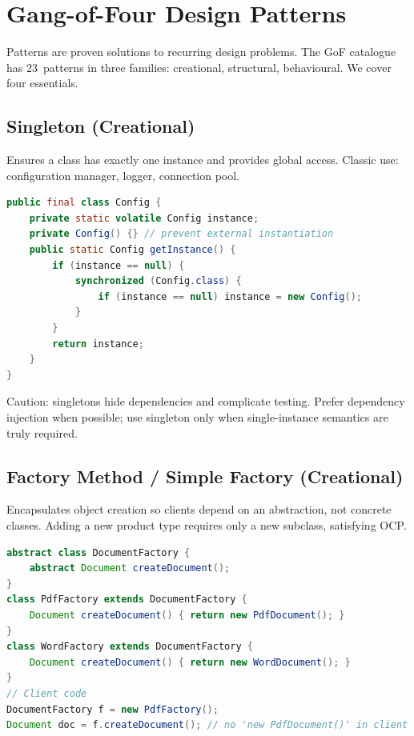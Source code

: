 \section{Gang-of-Four Design Patterns}

Patterns are proven solutions to recurring design problems. The GoF catalogue has 23~patterns in three families: creational, structural, behavioural. We cover four essentials.

\subsection{Singleton (Creational)}

Ensures a class has exactly one instance and provides global access. Classic use: configuration manager, logger, connection pool.

\begin{lstlisting}[language=Java,caption={Thread-safe Singleton (double-checked locking).}]
public final class Config {
    private static volatile Config instance;
    private Config() {} // prevent external instantiation
    public static Config getInstance() {
        if (instance == null) {
            synchronized (Config.class) {
                if (instance == null) instance = new Config();
            }
        }
        return instance;
    }
}
\end{lstlisting}

Caution: singletons hide dependencies and complicate testing. Prefer dependency injection when possible; use singleton only when single-instance semantics are truly required.

\subsection{Factory Method / Simple Factory (Creational)}

Encapsulates object creation so clients depend on an abstraction, not concrete classes. Adding a new product type requires only a new subclass, satisfying OCP.

\begin{lstlisting}[language=Java,caption={Factory Method -- creation delegated to subclasses.}]
abstract class DocumentFactory {
    abstract Document createDocument();
}
class PdfFactory extends DocumentFactory {
    Document createDocument() { return new PdfDocument(); }
}
class WordFactory extends DocumentFactory {
    Document createDocument() { return new WordDocument(); }
}
// Client code
DocumentFactory f = new PdfFactory();
Document doc = f.createDocument(); // no 'new PdfDocument()' in client
\end{lstlisting}

